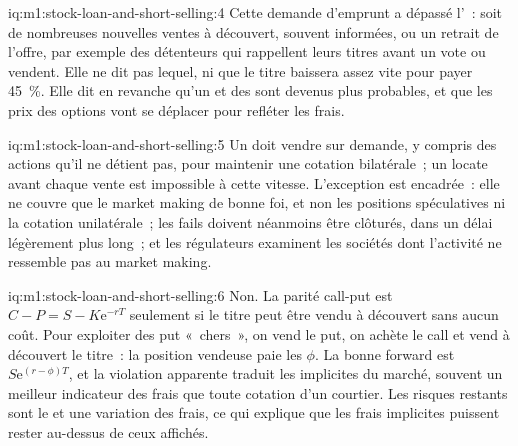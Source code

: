 \begin{solution}{iq:m1:stock-loan-and-short-selling:4}
Cette demande d'emprunt a dépassé l'~: soit de nombreuses nouvelles ventes à découvert,
souvent informées, ou un
retrait de l'offre, par exemple des détenteurs qui rappellent leurs titres avant un vote ou
vendent. Elle ne dit pas lequel, ni que le titre baissera assez vite pour
payer 45~\%. Elle dit en revanche qu'un  et des  sont devenus plus probables,
et que les prix des options vont se déplacer pour refléter les frais.
\end{solution}

\begin{solution}{iq:m1:stock-loan-and-short-selling:5}
Un  doit vendre sur demande, y compris des actions qu'il ne détient pas, pour
maintenir une cotation bilatérale~; un locate avant chaque vente est impossible à cette
vitesse. L'exception est encadrée~: elle ne couvre que le market making de bonne foi, et non
les positions spéculatives ni la cotation unilatérale~; les fails doivent néanmoins être clôturés,
dans un délai légèrement plus long~; et les régulateurs examinent les sociétés dont l'activité ne
ressemble pas au market making.
\end{solution}

\begin{solution}{iq:m1:stock-loan-and-short-selling:6}
Non. La parité call-put est $C - P = S - K\mathrm{e}^{-rT}$ seulement si le titre peut être vendu à découvert
sans aucun coût. Pour exploiter des put «~chers~», on vend le put, on achète le call
et vend à découvert le titre~: la position vendeuse paie les  $\phi$. La bonne
forward est $S\mathrm{e}^{(r-\phi)T}$, et la violation apparente traduit
les  implicites du marché, souvent un meilleur indicateur des frais que
toute cotation d'un courtier. Les risques restants sont le  et une variation des frais, ce qui
explique que les frais implicites puissent rester au-dessus de ceux affichés.
\end{solution}
